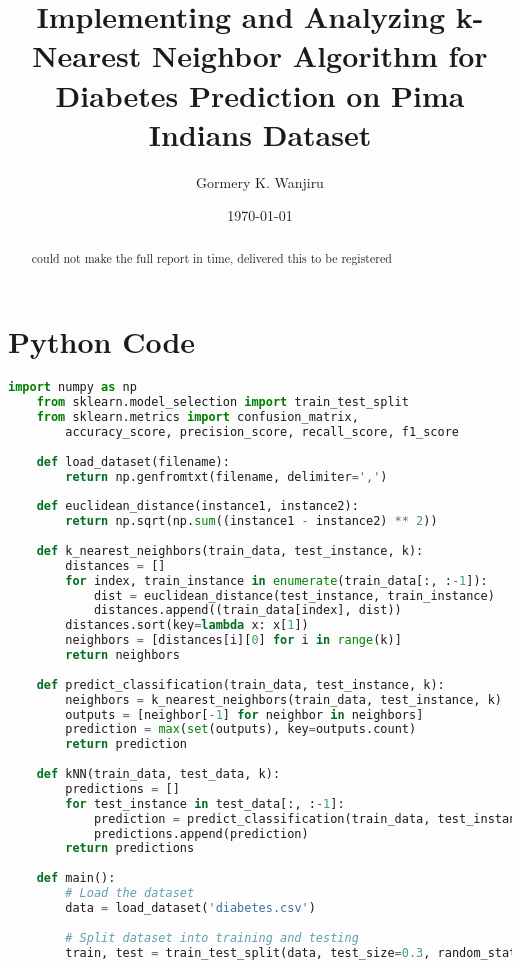 \documentclass[11pt, a4paper]{article}
\title{Implementing and Analyzing k-Nearest Neighbor Algorithm for Diabetes Prediction on Pima Indians Dataset}
\author{Gormery K. Wanjiru}
\date{\today}
\begin{document}
\maketitle

\begin{abstract}
    could not make the full report in time, delivered this to be registered
\end{abstract}



\section{Python Code}
\begin{lstlisting}[language=Python]
    import numpy as np
    from sklearn.model_selection import train_test_split
    from sklearn.metrics import confusion_matrix, 
        accuracy_score, precision_score, recall_score, f1_score
    
    def load_dataset(filename):
        return np.genfromtxt(filename, delimiter=',')
    
    def euclidean_distance(instance1, instance2):
        return np.sqrt(np.sum((instance1 - instance2) ** 2))
    
    def k_nearest_neighbors(train_data, test_instance, k):
        distances = []
        for index, train_instance in enumerate(train_data[:, :-1]):
            dist = euclidean_distance(test_instance, train_instance)
            distances.append((train_data[index], dist))
        distances.sort(key=lambda x: x[1])
        neighbors = [distances[i][0] for i in range(k)]
        return neighbors
    
    def predict_classification(train_data, test_instance, k):
        neighbors = k_nearest_neighbors(train_data, test_instance, k)
        outputs = [neighbor[-1] for neighbor in neighbors]
        prediction = max(set(outputs), key=outputs.count)
        return prediction
    
    def kNN(train_data, test_data, k):
        predictions = []
        for test_instance in test_data[:, :-1]:
            prediction = predict_classification(train_data, test_instance, k)
            predictions.append(prediction)
        return predictions
    
    def main():
        # Load the dataset
        data = load_dataset('diabetes.csv')
        
        # Split dataset into training and testing
        train, test = train_test_split(data, test_size=0.3, random_state=42)
        

\end{lstlisting}
\end{document}
